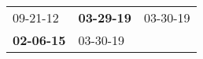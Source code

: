 \begin{supertabular}{p{0.33\columnwidth}p{0.33\columnwidth}p{0.33\columnwidth}}
          09-21-12\textsuperscript{} &  \textbf{03-29-19\textsuperscript{}} &  03-30-19\textsuperscript{} \\
 \textbf{02-06-15\textsuperscript{}} &           03-30-19\textsuperscript{} &                             \\
\end{supertabular}
